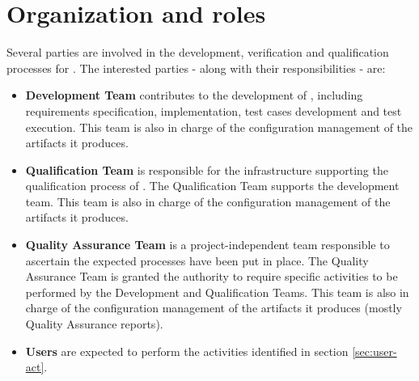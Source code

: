 \section{Organization and roles}
Several parties are involved in the development, verification and qualification processes for \xcov{}. The interested parties - along with their responsibilities - are:
\begin{itemize}
\item \textbf{\xcov{} Development Team} contributes to the development of \xcov{}, including requirements specification, implementation, test cases development and test execution. This team is also in charge of the configuration management of the artifacts it produces.
\item \textbf{\xcov{} Qualification Team} is responsible for the infrastructure
supporting the qualification process of \xcov{}. The Qualification Team supports the development team. This team is also in charge of the configuration management of the artifacts it produces.
\item \textbf{\xcov{} Quality Assurance Team} is a project-independent team responsible to ascertain the expected processes have been put in place. The Quality Assurance Team is granted the authority to require specific activities to be performed by the \xcov{} Development and Qualification Teams. This team is also in charge of the configuration management of the artifacts it produces (mostly Quality Assurance reports).
\item \textbf{\xcov{} Users} are expected to perform the activities identified in
section \ref{sec:user-act}.
\end{itemize}
